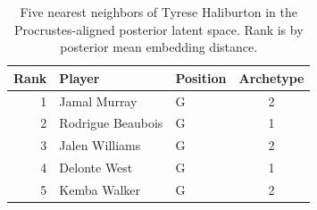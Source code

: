 \begin{table}[htbp]
  \centering\small
  \begin{tabular}{rllc}
    \toprule
    Rank & Player & Position & Archetype \\
    \midrule
    1 & Jamal Murray & G & 2 \\
    2 & Rodrigue Beaubois & G & 1 \\
    3 & Jalen Williams & G & 2 \\
    4 & Delonte West & G & 1 \\
    5 & Kemba Walker & G & 2 \\
    \bottomrule
  \end{tabular}
  \caption{Five nearest neighbors of Tyrese Haliburton in the Procrustes-aligned posterior latent space. Rank is by posterior mean embedding distance.}
  \label{tab:Tyrese_Haliburton_neighbors}
\end{table}

